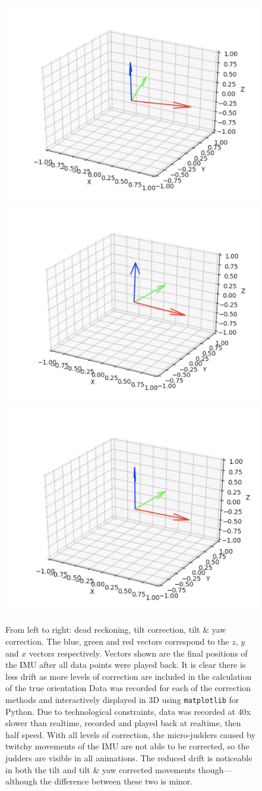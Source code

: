 \documentclass[11pt]{article}
\begin{document}
\begin{figure}[htp]

\centering
\includegraphics[width=.32\textwidth]{4gyro_after}\hfill
\includegraphics[width=.32\textwidth]{5acc_after}\hfill
\includegraphics[width=.32\textwidth]{6mag_after}

\caption{From left to right: dead reckoning, tilt correction, tilt \& yaw correction. The blue, green and red vectors correspond to the $z$, $y$ and $x$ vectors respectively. Vectors shown are the final positions of the IMU after all data points were played back. It is clear there is less drift as more levels of correction are included in the calculation of the true orientation Data was recorded for each of the correction methods and interactively displayed in 3D using \texttt{matplotlib} for Python. Due to technological constraints, data was recorded at 40x slower than realtime, recorded and played back at realtime, then half speed. With all levels of correction, the micro-judders caused by twitchy movements of the IMU are not able to be corrected, so the judders are visible in all animations. The reduced drift is noticeable in both the tilt and tilt \& yaw corrected movements though---although the difference between these two is minor.}
\label{fig:euler-angles}

\end{figure}
\end{document}
